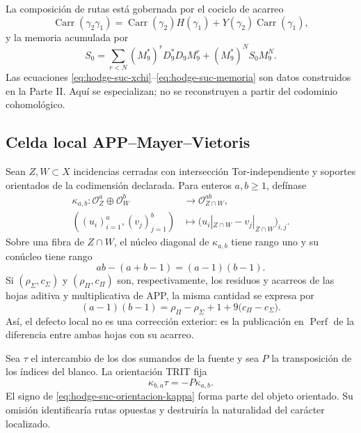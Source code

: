La composición de rutas está gobernada por el cociclo de acarreo
\begin{equation}\label{eq:hodge-suc-carry}
 \operatorname{Carr}(\gamma _2\gamma _1)
 =\operatorname{Carr}(\gamma _2)H(\gamma _1)
  +Y(\gamma _2)\operatorname{Carr}(\gamma _1),
\end{equation}
y la memoria acumulada por
\begin{equation}\label{eq:hodge-suc-memoria}
 S_0=\sum_{r<N}(M_9^{*})^{r}D_9^{*}D_9M_9^{r}
     +(M_9^{*})^{N}S_0M_9^{N}.
\end{equation}
Las ecuaciones \eqref{eq:hodge-suc-xchi}--\eqref{eq:hodge-suc-memoria}
son datos construidos en la Parte II. Aquí se especializan; no se
reconstruyen a partir del codominio cohomológico.

\subsection*{Celda local APP--Mayer--Vietoris}

Sean \(Z,W\subset X\) incidencias cerradas con intersección
Tor-independiente y soportes orientados de la codimensión declarada. Para
enteros \(a,b\geq1\), defínase
\begin{equation}\label{eq:hodge-suc-kappa}
 \begin{aligned}
 \kappa_{a,b}:\mathcal O_Z^{a}\oplus\mathcal O_W^{b}
 &\longrightarrow \mathcal O_{Z\cap W}^{ab},\\
 ((u_i)_{i=1}^{a},(v_j)_{j=1}^{b})
 &\longmapsto
 \bigl(u_i|_{Z\cap W}-v_j|_{Z\cap W}\bigr)_{i,j}.
 \end{aligned}
\end{equation}
Sobre una fibra de \(Z\cap W\), el núcleo diagonal de
\(\kappa_{a,b}\) tiene rango uno y su conúcleo tiene rango
\begin{equation}\label{eq:hodge-suc-defecto-rango}
 ab-(a+b-1)=(a-1)(b-1).
\end{equation}
Si \((\rho_{\Sigma},c_{\Sigma})\) y
\((\rho_{\Pi},c_{\Pi})\) son, respectivamente, los residuos y acarreos de
las hojas aditiva y multiplicativa de APP, la misma cantidad se expresa por
\begin{equation}\label{eq:hodge-suc-celda-carry}
 (a-1)(b-1)
 =\rho_{\Pi}-\rho_{\Sigma}+1
  +9\bigl(c_{\Pi}-c_{\Sigma}\bigr).
\end{equation}
Así, el defecto local no es una corrección exterior: es la publicación en
\(\operatorname{Perf}\) de la diferencia entre ambas hojas con su acarreo.

Sea \(\tau\) el intercambio de los dos sumandos de la fuente y sea \(P\)
la transposición de los índices del blanco. La orientación TRIT fija
\begin{equation}\label{eq:hodge-suc-orientacion-kappa}
 \kappa_{b,a}\tau=-P\kappa_{a,b}.
\end{equation}
El signo de \eqref{eq:hodge-suc-orientacion-kappa} forma parte del objeto
orientado. Su omisión identificaría rutas opuestas y destruiría la
naturalidad del carácter localizado.

